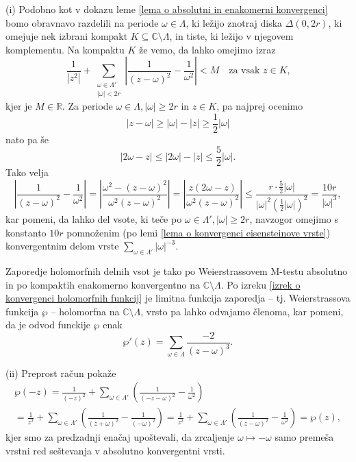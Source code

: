 \documentclass[mat1]{fmfdelo}
\newcommand{\R}{\mathbb R}
\newcommand{\N}{\mathbb N}
\newcommand{\C}{\mathbb C}
\newcommand{\om}{\omega}
\newcommand{\abs}[1]{\left\lvert #1 \right\rvert}
\newcommand{\disk}[2]{\Delta(#1, #2)}
\theoremstyle{definition}
\begin{document}
\begin{dokaz}
    (i) Podobno kot v dokazu leme \ref{lema o absolutni in enakomerni konvergenci} bomo obravnavo razdelili na periode $\om\in \Lambda$, ki ležijo znotraj diska $\disk{0}{2r}$, ki omejuje nek izbrani kompakt $K \subseteq \C\setminus\Lambda$, in tiste, ki ležijo v njegovem komplementu. 
    Na kompaktu $K$ že vemo, da lahko omejimo izraz
    \[
        \frac{1}{\abs{z^2}} + \sum_{\substack{\om\in\Lambda' \\ \abs{\om} < 2r}} \left\lvert\frac{1}{(z - \om)^2} - \frac{1}{\om^2}\right\rvert < M \quad \text{za vsak $z \in K$,}
    \]
    kjer je $M \in \R$.
    Za periode $\om\in\Lambda, \abs{\om} \geq 2r$ in $z \in K$, pa najprej ocenimo 
    \[
        \abs{z - \om} \geq \abs{\om} - \abs{z} \geq \frac{1}{2}\abs{\om}  
    \] 
    nato pa še
    \[
        \abs{2\om - z} \leq \abs{2\om} - \abs{z} \leq \frac{5}{2} \abs{\om}.
    \]
    Tako velja
    \[
        \abs{\frac{1}{(z - \om)^2} - \frac{1}{\om^2}} = 
        \abs{\frac{\om^2 - (z - \om)^2}{\om^2(z - \om)^2}} =
        \abs{\frac{z(2\om - z)}{\om^2 (z - \om)^2}} \leq
        \frac{r \cdot \frac{5}{2}\abs{\om}}{\abs{\om}^2(\frac{1}{2}\abs{\om})^2} = 
        \frac{10r}{\abs{\om}^3},
    \]
    kar pomeni, da lahko del vsote, ki teče po $\om\in\Lambda', \abs{\om} \geq 2r$, navzogor omejimo s konstanto $10r$ pomnoženim (po lemi \ref{lema o konvergenci eisensteinove vrste}) konvergentnim delom vrste $\sum_{\om\in\Lambda'}\abs{\om}^{-3}$.

    Zaporedje holomorfnih delnih vsot je tako po Weierstrassovem M-testu absolutno in po kompaktih enakomerno konvergentno na $\C\setminus\Lambda$. Po izreku \ref{izrek o konvergenci holomorfnih funkcij} je limitna funkcija zaporedja -- tj. Weierstrassova funkcija $\wp$ -- holomorfna na $\C\setminus\Lambda$, vrsto pa lahko odvajamo členoma, kar pomeni, da je odvod funckije $\wp$ enak
    \[
        \wp'(z) = \sum_{\om \in \Lambda}\frac{-2}{(z-\om)^3}. 
    \]

    (ii) Preprost račun pokaže
    \begin{multline*}
        \wp(-z) =   
        \frac{1}{(-z)^2} + \sum_{\om\in\Lambda'}\left(\frac{1}{(-z-\om)^2} - \frac{1}{\om^2}\right) \\ = 
        \frac{1}{z^2} + \sum_{\om\in\Lambda'}\left(\frac{1}{(z+\om)^2} - \frac{1}{(-\om)^2}\right) =
        \frac{1}{z^2} + \sum_{\om\in\Lambda'}\left(\frac{1}{(z-\om)^2} - \frac{1}{\om^2}\right) =
        \wp(z),
    \end{multline*}
    kjer smo za predzadnji enačaj upoštevali, da zrcaljenje $\omega \mapsto -\omega$ samo premeša vrstni red seštevanja v absolutno konvergentni vrsti.


\end{dokaz}
\end{document}
